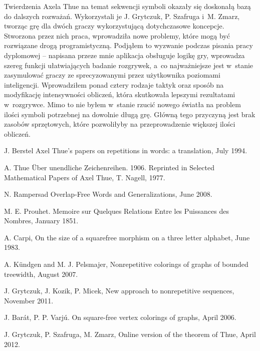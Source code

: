\documentclass[document]{xmgr}
\begin{document}
\summary
Twierdzenia Axela Thue na temat sekwencji symboli okazały się doskonałą bazą do dalszych rozważań. Wykorzystali je J. Grytczuk, P. Szafruga i~M. Zmarz, tworząc grę dla dwóch graczy wykorzystującą dotychczasowe koncepcje. Stworzona przez nich praca, wprowadziła nowe problemy, które mogą być rozwiązane drogą programistyczną. Podjąłem to wyzwanie podczas pisania pracy dyplomowej -- napisana przeze mnie aplikacja obsługuje logikę gry, wprowadza szereg funkcji ułatwiających badanie rozgrywek, a~co najważniejsze jest w~stanie zasymulować graczy ze sprecyzowanymi przez użytkownika poziomami inteligencji. Wprowadziłem ponad cztery rodzaje taktyk oraz sposób na modyfikację intensywności obliczeń, która skutkowała lepszymi rezultatami w~rozgrywce. Mimo to nie byłem w~stanie rzucić nowego światła na problem ilości symboli potrzebnej na dowolnie długą grę. Główną tego przyczyną jest brak zasobów sprzętowych, które pozwoliłyby na przeprowadzenie większej ilości obliczeń.

\appendix


\begin{thebibliography}{99}

 J. Berstel Axel Thue's papers on repetitions in words: a translation, July 1994.

 A. Thue Über unendliche Zeichenreihen. 1906. Reprinted in Selected Mathematical Papers of Axel Thue, T. Nagell, 1977.

 N. Rampersad Overlap-Free Words and Generalizations, June 2008.

 M. E. Prouhet. Memoire sur Quelques Relations Entre les Puissances des Nombres, January 1851.

 A. Carpi, On the size of a squarefree morphism on a three letter alphabet, June 1983.

 A. Kündgen and M. J. Pelsmajer, Nonrepetitive colorings of graphs of bounded treewidth, August 2007.

 J. Grytczuk, J. Kozik, P. Micek, New approach to nonrepetitive sequences, November 2011.

 J. Barát, P. P. Varjú. On square-free vertex colorings of graphs, April 2006.

 J. Grytczuk, P. Szafruga, M. Zmarz, Online version of the theorem of Thue, April 2012.

\end{thebibliography}

\listoftables

\listoffigures

\oswiadczenie
\end{document}
